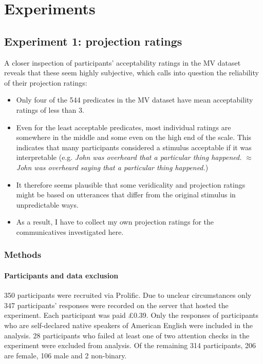 \documentclass[11pt,fleqn]{article}
\newcommand{\6}{\mbox{$[\hspace*{-.6mm}[$}}
\newcommand{\9}{\mbox{$]\hspace*{-.6mm}]$}}
\begin{document}
\section{Experiments}
\subsection{Experiment 1: projection ratings}
A closer inspection of participants’ acceptability ratings in the MV dataset reveals that these seem highly subjective, which calls into question the reliability of their projection ratings:
\begin{itemize}
	\item Only four of the 544 predicates in the MV dataset have mean acceptability ratings of less than 3. 
	\item Even for the least acceptable predicates, most individual ratings are somewhere in the middle and some even on the high end of the scale. This indicates that many participants considered a stimulus acceptable if it was interpretable (e.g. \emph{John was overheard that a particular thing happened.} $\approx$ \emph{John was overheard saying that a particular thing happened.}) 
	\item It therefore seems plausible that some veridicality and projection ratings might be based on utterances that differ from the original stimulus in unpredictable ways. 
	\item As a result, I have to collect my own projection ratings for the communicatives investigated here.
\end{itemize}

\subsubsection{Methods}
\paragraph{Participants and data exclusion}

350 participants were recruited via Prolific. Due to unclear circumstances only 347 participants' responses were recorded on the server that hosted the experiment. Each participant was paid £0.39. Only the responses of participants who are self-declared native speakers of American English were included in the analysis. 28 participants who failed at least one of two attention checks in the experiment were excluded from analysis. Of the remaining 314 participants, 206 are female, 106 male and 2 non-binary.
\end{document}
